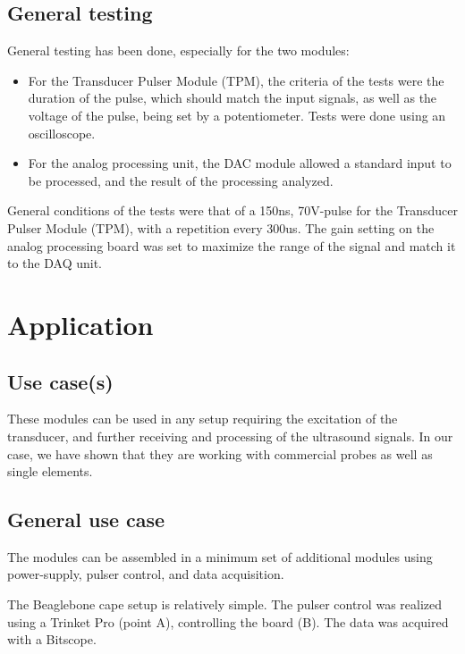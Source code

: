 \documentclass[letterpaper, 10 pt, conference]{ieeeconf} %
\begin{document}
\subsection{General testing}

General testing has been done, especially for the two modules:

\begin{itemize}
\item For the Transducer Pulser Module (TPM), the criteria of the tests were the duration of the pulse, which should match the input signals, as well as the voltage of the pulse, being set by a potentiometer. Tests were done using an oscilloscope.
\item For the analog processing unit, the DAC module allowed a standard input to be processed, and the result of the processing analyzed.
\end{itemize}

General conditions of the tests were that of a 150ns, 70V-pulse for the Transducer Pulser Module (TPM), with a repetition every 300us. The gain setting on the analog processing board was set to maximize the range of the signal and match it to the DAQ unit.

\section{Application}

\subsection{Use case(s)}

These modules can be used in any setup requiring the excitation of the transducer, and further receiving and processing of the ultrasound signals. In our case, we have shown that they are working with commercial probes as well as single elements.

\subsection{General use case}

The modules can be assembled in a minimum set of additional modules using power-supply, pulser control, and data acquisition.

The Beaglebone cape setup is relatively simple. The pulser control was realized using a Trinket Pro (point A), controlling the board (B). The data was acquired with a Bitscope.
\end{document}
